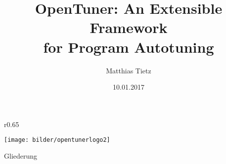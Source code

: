 
\usepackage[utf8]{inputenc}
\usepackage{babel}
\usepackage{floatflt}
\usepackage{float}
\usepackage{graphics}
\usepackage{graphicx}
\usepackage{listings}
\usepackage{color}
\usepackage{url}
\usepackage{hyperref}
\usepackage{wrapfig}


%
%


\title{OpenTuner: An Extensible Framework\\for Program Autotuning}
\author{Matthias Tietz}
\date{10.01.2017}





    \tucthreeheadlines

    \begingroup
      \begin{frame}
        \titlepage
    \end{frame}
    \endgroup

    \begingroup
    \begin{frame}
        \begin{wrapfigure}{r}{0.65\textwidth}
          \begin{center}
            \texttt{[image: bilder/opentunerlogo2]}
          \end{center}
        \end{wrapfigure}
        \large{Gliederung}
        \normalsize \tableofcontents  
    \end{frame}
    \endgroup

